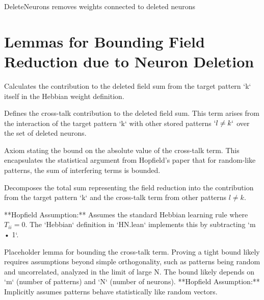 \begin{definition}\label{deleted_neurons_field_effect}
\leanok
DeleteNeurons removes weights connected to deleted neurons 
\end{definition}

\section{Lemmas for Bounding Field Reduction due to Neuron Deletion}

\begin{definition}\label{hebbian_weight_deleted_neurons_l_eq_k_term}
Calculates the contribution to the deleted field sum from the target pattern `k` itself
in the Hebbian weight definition.
\leanok
\end{definition}

\begin{definition}\label{hebbian_weight_deleted_neurons_cross_talk_term}
\leanok
Defines the cross-talk contribution to the deleted field sum.
This term arises from the interaction of the target pattern `k` with other stored patterns $`l \neq k`$
over the set of deleted neurons.
\end{definition}

\begin{lemma}\label{cross_talk_term_abs_bound_assumption}
Axiom stating the bound on the absolute value of the cross-talk term.
This encapsulates the statistical argument from Hopfield's paper that for
random-like patterns, the sum of interfering terms is bounded.
\end{lemma}

\begin{lemma}\label{Hebbian_stable}
\leanok
Decomposes the total sum representing the field reduction into the contribution
from the target pattern `k` and the cross-talk term from other patterns $l \neq k.$

**Hopfield Assumption:** Assumes the standard Hebbian learning rule where $T_{ii} = 0$.
The `Hebbian` definition in `HN.lean` implements this by subtracting `m • 1`.
\end{lemma}

\begin{lemma}\label{bound_cross_talk_term}
Placeholder lemma for bounding the cross-talk term.
Proving a tight bound likely requires assumptions beyond simple orthogonality,
such as patterns being random and uncorrelated, analyzed in the limit of large N.
The bound likely depends on `m` (number of patterns) and `N` (number of neurons).
**Hopfield Assumption:** Implicitly assumes patterns behave statistically like random vectors.
\end{lemma}


